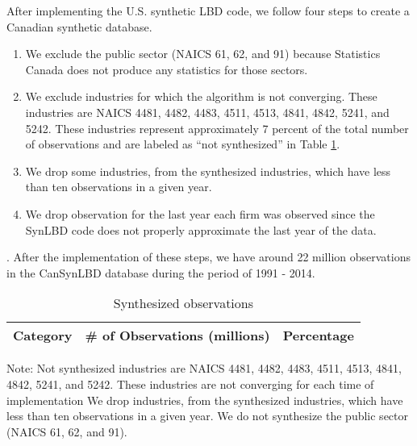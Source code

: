 After implementing the U.S. synthetic LBD code, we follow four steps to create a Canadian synthetic database. \begin{enumerate}
    \item We exclude the public sector (NAICS 61, 62, and 91) because Statistics Canada does not produce any statistics for those sectors.
    \item We exclude industries for which the algorithm is not converging. These industries are NAICS 4481,    4482,     4483,     4511,     4513,     4841,     4842,     5241, and 5242. These industries represent approximately 7 percent of the total number of observations and are labeled as ``not synthesized'' in Table \ref{Synthesized_observations}.
    \item We drop some industries, from the synthesized industries, which have less than ten observations in a given year.
    \item We drop observation for the last year each firm was observed since the SynLBD code does not properly approximate the last year of the data.
\end{enumerate}. 
After the implementation of these steps, we have around 22 million observations in the CanSynLBD database during the period of 1991 - 2014.

\begin{table}[H]
  \centering
\begin{threeparttable}
  \caption{Synthesized observations}  \label{Synthesized_observations} \medskip
  \renewcommand{\arraystretch}{1}
  \begin{tabular}{l  c c }
    \toprule
    \textbf{Category}&\textbf{\# of Observations (millions)}&\textbf{Percentage}\\
    \midrule

   \bottomrule
  \end{tabular} 
\begin{tablenotes}
\small
\item Note: Not synthesized industries are NAICS 4481,    4482,     4483,     4511,     4513,     4841,     4842, 5241, and 5242. These industries are not converging for each time of implementation We drop industries, from the synthesized industries, which have less than ten observations in a given year. We do not synthesize the public sector (NAICS 61, 62, and 91).
 \end{tablenotes}
 \end{threeparttable}
\end{table}

